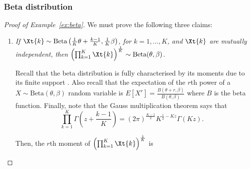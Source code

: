 \documentclass[12pt]{article}
\begin{document}
\subsubsection{Beta distribution}
\label{subsec:beta-proofs}

\begin{proof}[Proof of Example~\ref{ex:beta}]
We must prove the following three claims:
\begin{enumerate}
    \item \emph{If $\Xt{k} \sim \text{Beta}\left(\frac{1}{K}\theta + \frac{k-1}{K}, \frac{1}{K}\beta\right)$, for $k=1,\dots,K$, and $\Xt{k}$ are mutually independent, then $\left(\prod_{k=1}^K \Xt{k}\right)^{\frac{1}{K}} \sim \text{Beta}(\theta, \beta)$.} 


Recall that the beta distribution is fully characterised by its moments due to its finite support \citep{feller1971}. Also recall that the expectation of the $r$th power of a $X\sim\text{Beta}(\theta,\beta)$ random variable is $E[X^r]=\frac{B(\theta+r,\beta)}{B(\theta,\beta)}$ where $B$ is the beta function. Finally, note that the Gauss multiplication theorem \citep[page 256]{abramowitz1972handbook} says that
$$
\prod_{k=1}^K\Gamma\left(z+\frac{k-1}{K}\right)=(2\pi)^{\frac{K-1}{2}}K^{\frac{1}{2}-Kz}\Gamma(Kz).
$$


Then, the $r$th moment of $\left(\prod_{k=1}^K \Xt{k}\right)^{\frac{1}{K}}$ is


\end{enumerate}
\end{proof}
\end{document}

